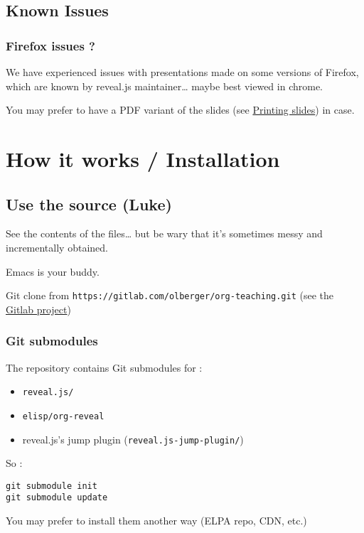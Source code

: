 \documentclass[a4paper]{article}
\begin{document}
\subsection{Known Issues}
\label{sec:org8be730d}

\subsubsection{Firefox issues ?}
\label{sec:orgf6dbe79}

We have experienced issues with presentations made on some versions of Firefox, which are known by reveal.js maintainer\ldots{} maybe best viewed in chrome.

You may prefer to have a PDF variant of the slides (see \hyperref[sec:orgd547078]{Printing slides}) in case.



\section{How it works / Installation}
\label{sec:org1751ddd}
\subsection{Use the source (Luke)}
\label{sec:org5b50bbb}

See the contents of the files\ldots{} but be wary that it's sometimes messy and incrementally obtained.

Emacs is your buddy.

Git clone from \texttt{https://gitlab.com/olberger/org-teaching.git} (see the \href{https://gitlab.com/olberger/org-teaching}{Gitlab project})

\subsubsection{Git submodules}
\label{sec:org67a8a81}

The repository contains Git submodules for :
\begin{itemize}
\item \texttt{reveal.js/}
\item \texttt{elisp/org-reveal}
\item reveal.js's jump plugin (\texttt{reveal.js-jump-plugin/})
\end{itemize}

So :
\begin{verbatim}
git submodule init
git submodule update
\end{verbatim}
You may prefer to install them another way (ELPA repo, CDN, etc.)
\end{document}

